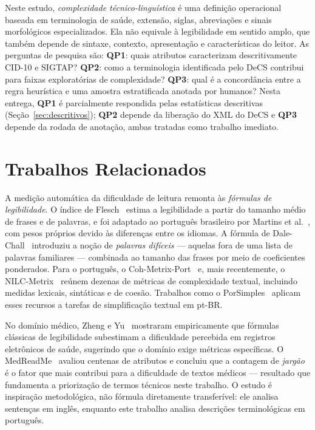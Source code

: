 \documentclass[12pt]{article}
\begin{document}
Neste estudo, \textit{complexidade técnico-linguística} é uma definição
operacional baseada em terminologia de saúde, extensão, siglas, abreviações e
sinais morfológicos especializados. Ela não equivale à legibilidade em sentido
amplo, que também depende de sintaxe, contexto, apresentação e características
do leitor. As perguntas de pesquisa são: \textbf{QP1}: quais atributos
caracterizam descritivamente CID-10 e SIGTAP? \textbf{QP2}: como a terminologia
identificada pelo DeCS contribui para faixas exploratórias de complexidade?
\textbf{QP3}: qual é a concordância entre a regra heurística e uma amostra
estratificada anotada por humanos? Nesta entrega, \textbf{QP1} é parcialmente
respondida pelas estatísticas descritivas (Seção~\ref{sec:descritivos}); \textbf{QP2}
depende da liberação do XML do DeCS e \textbf{QP3} depende da rodada de anotação,
ambas tratadas como trabalho imediato.

\section{Trabalhos Relacionados}

A medição automática da dificuldade de leitura remonta às
\textit{fórmulas de legibilidade}. O índice de Flesch~\cite{flesch1948}
estima a legibilidade a partir do tamanho médio de frases e de palavras, e
foi adaptado ao português brasileiro por Martins et al.~\cite{martins1996},
com pesos próprios devido às diferenças entre os idiomas. A
fórmula de Dale-Chall~\cite{dalechall1948,chall1995} introduziu a noção
de \textit{palavras difíceis} --- aquelas fora de uma lista de palavras
familiares --- combinada ao tamanho das frases por meio de coeficientes
ponderados. Para o português, o Coh-Metrix-Port~\cite{scarton2010cohmetrix}
e, mais recentemente, o NILC-Metrix~\cite{leal2024nilcmetrix} reúnem dezenas
de métricas de complexidade textual, incluindo medidas lexicais, sintáticas e
de coesão. Trabalhos como o PorSimples~\cite{aluisio2010porsimples} aplicam
esses recursos a tarefas de simplificação textual em pt-BR.

No domínio médico, Zheng e Yu~\cite{zheng2017} mostraram empiricamente que
fórmulas clássicas de legibilidade subestimam a dificuldade percebida em
registros eletrônicos de saúde, sugerindo que o domínio exige métricas
específicas. O MedReadMe~\cite{jiang2024medreadme} avaliou centenas de
atributos e concluiu que a contagem de \textit{jargão} é o fator que mais
contribui para a dificuldade de textos médicos --- resultado que fundamenta
a priorização de termos técnicos neste trabalho. O estudo é inspiração
metodológica, não fórmula diretamente transferível: ele analisa sentenças em
inglês, enquanto este trabalho analisa descrições terminológicas em
português.
\end{document}
